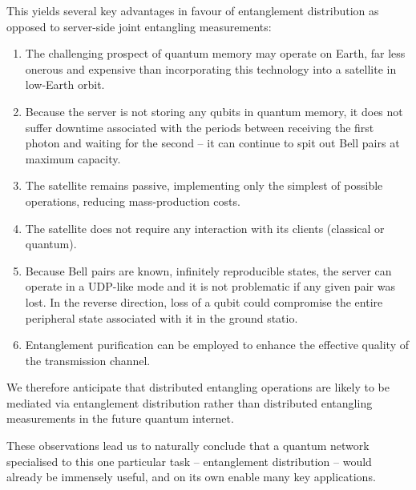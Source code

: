 This yields several key advantages in favour of entanglement distribution as opposed to server-side joint entangling measurements:
\begin{enumerate}
	\item The challenging prospect of quantum memory may operate on Earth, far less onerous and expensive than incorporating this technology into a satellite in low-Earth orbit.
	\item Because the server is not storing any qubits in quantum memory, it does not suffer downtime associated with the periods between receiving the first photon and waiting for the second -- it can continue to spit out Bell pairs at maximum capacity.
	\item The satellite remains passive, implementing only the simplest of possible operations, reducing mass-production costs.
	\item The satellite does not require any interaction with its clients (classical or quantum).
	\item Because Bell pairs are known, infinitely reproducible states, the server can operate in a UDP-like mode and it is not problematic if any given pair was lost. In the reverse direction, loss of a qubit could compromise the entire peripheral state associated with it in the ground statio.
	\item Entanglement purification can be employed to enhance the effective quality of the transmission channel.
\end{enumerate}

We therefore anticipate that distributed entangling operations are likely to be mediated via entanglement distribution rather than distributed entangling measurements in the future quantum internet.

These observations lead us to naturally conclude that a quantum network specialised to this one particular task -- entanglement distribution -- would already be immensely useful, and on its own enable many key applications.